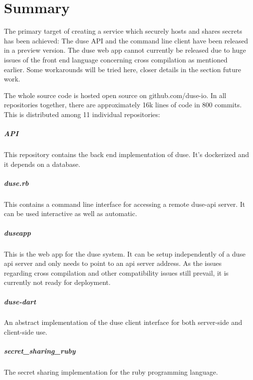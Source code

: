\chapter{Summary}

The primary target of creating a service which securely hosts and shares
secrets has been achieved: The duse API and the command line client have
been released in a preview version. The duse web app cannot currently be
released due to huge issues of the front end language concerning cross
compilation as mentioned earlier. Some workarounds will be tried here,
closer details in the section future work.

The whole source code is hosted open source on github.com/duse-io.
In all repositories together, there are approximately 16k lines of code in
800 commits. This is distributed among 11 individual repositories:

\paragraph{API} This repository contains the back end implementation of
duse. It's dockerized and it depends on a database.

\paragraph{duse.rb} This contains a command line interface for accessing
a remote duse-api server. It can be used interactive as well as automatic.

\paragraph{duseapp} This is the web app for the duse system. It can be
setup independently of a duse api server and only needs to point to an
api server address. As the issues regarding cross compilation and other
compatibility issues still prevail, it is currently not ready for deployment.

\paragraph{duse-dart} An abstract implementation of the duse client interface
for both server-side and client-side use.

\paragraph{secret\_sharing\_ruby} The secret sharing implementation for the
ruby programming language.

